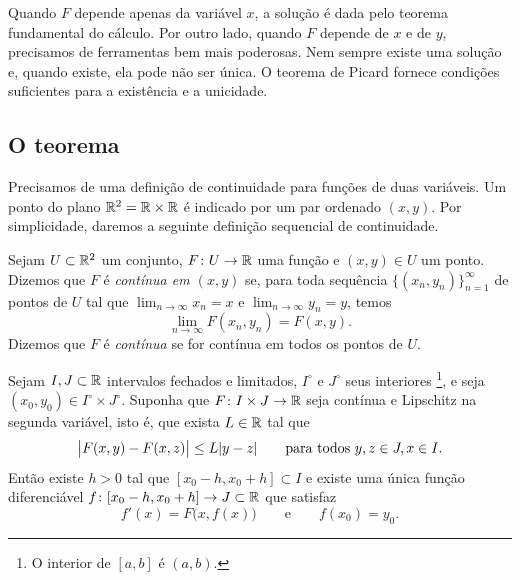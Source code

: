 Quando $F$ depende apenas da variável $x$, a solução é dada pelo teorema
fundamental do cálculo. Por outro lado, quando $F$ depende de $x$ e de $y$,
precisamos de ferramentas bem mais poderosas. Nem sempre existe uma
solução e, quando existe, ela pode não ser única. O teorema de Picard
fornece condições suficientes para a existência e a unicidade.

\subsection{O teorema}

Precisamos de uma definição de continuidade para funções de duas variáveis.
Um ponto do plano ${\mathbb{R}}^2 = {\mathbb{R}} \times {\mathbb{R}}$ é indicado por um par ordenado
$(x,y)$. Por simplicidade, daremos a seguinte definição sequencial de
continuidade.

\begin{defn}
Sejam $U \subset {\mathbb{R}}^2$ um conjunto, $F \colon U \to {\mathbb{R}}$ uma função e
$(x,y) \in U$ um ponto. Dizemos que $F$ é
\emph{contínua em $(x,y)$}
se, para toda sequência
$\bigl\{ (x_n,y_n) \bigr\}_{n=1}^\infty$ de pontos de $U$ tal que
$\lim_{n\to\infty} x_n = x$ e $\lim_{n\to\infty} y_n = y$, temos
\begin{equation*}
\lim_{n \to \infty} F(x_n,y_n) = 
F(x,y) .
\end{equation*}
Dizemos que $F$ é \emph{contínua} se for contínua em todos os pontos de $U$.
\end{defn}

\begin{thm}%
%
\label{thm:fs:picard}
Sejam $I, J \subset {\mathbb{R}}$ intervalos fechados e limitados,
$I^\circ$ e $J^\circ$ seus interiores%
\footnote{O interior de $[a,b]$ é $(a,b)$.},
e seja $(x_0,y_0) \in I^\circ \times J^\circ$.
Suponha que $F \colon I \times J \to {\mathbb{R}}$ seja contínua e Lipschitz na
segunda variável, isto é, que exista $L \in {\mathbb{R}}$ tal que
\begin{equation*}
\bigl\lvert {F(x,y) - F(x,z)} \bigr\rvert \leq L \lvert {y-z} \rvert
\qquad \text{para todos } y,z \in J, x \in I .
\end{equation*}
Então existe $h > 0$ tal que $[x_0-h,x_0+h] \subset I$ e existe uma única
função diferenciável $f \colon [x_0 - h, x_0 + h] \to J \subset {\mathbb{R}}$ que
satisfaz
\begin{equation} \label{picard:diffeq}
f'(x) = F\bigl(x,f(x)\bigr) \qquad \text{e} \qquad f(x_0) = y_0.
\end{equation}
\end{thm}

